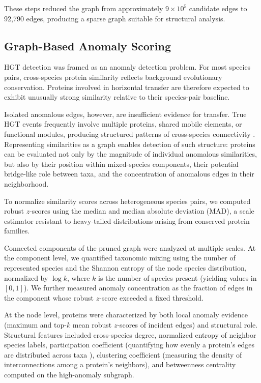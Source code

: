 \documentclass[11pt]{article}
\begin{document}
These steps reduced the graph from approximately $9\times 10^5$ candidate edges to 92{,}790 edges, producing a sparse graph suitable for structural analysis.

\subsection{Graph-Based Anomaly Scoring}

HGT detection was framed as an anomaly detection problem. 
For most species pairs, cross-species protein similarity reflects background evolutionary conservation. 
Proteins involved in horizontal transfer are therefore expected to exhibit unusually strong similarity relative to their species-pair baseline.

Isolated anomalous edges, however, are insufficient evidence for transfer. 
True HGT events frequently involve multiple proteins, shared mobile elements, or functional modules, 
producing structured patterns of cross-species connectivity \cite{Frost2005,Ochman2000}. 
Representing similarities as a graph enables detection of such structure: proteins can be evaluated not only by the magnitude of individual anomalous similarities, but also by their position within mixed-species components, their potential bridge-like role between taxa, and the concentration of anomalous edges in their neighborhood.

To normalize similarity scores across heterogeneous species pairs, we computed robust $z$-scores using the median and median absolute deviation (MAD), a scale estimator resistant to heavy-tailed distributions \cite{Rousseeuw1993} arising from conserved protein families.

Connected components of the pruned graph were analyzed at multiple scales. 
At the component level, we quantified taxonomic mixing using the number of represented species and the Shannon entropy of the node species distribution, normalized by $\log k$, where $k$ is the number of species present (yielding values in $[0,1]$). 
We further measured anomaly concentration as the fraction of edges in the component whose robust $z$-score exceeded a fixed threshold.

At the node level, proteins were characterized by both local anomaly evidence (maximum and top-$k$ mean robust $z$-scores of incident edges) and structural role. 
Structural features included cross-species degree, normalized entropy of neighbor species labels, participation coefficient (quantifying how evenly a protein’s edges are distributed across taxa \cite{Guimera2005}), clustering coefficient (measuring the density of interconnections among a protein’s neighbors), and betweenness centrality computed on the high-anomaly subgraph.
\end{document}
